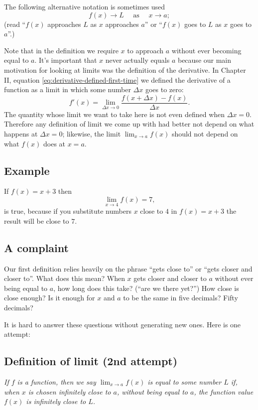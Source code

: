 The following alternative notation is sometimes used
\[
f(x)\to L \quad\text{ as } \quad x\to a;
\]
(read ``$f(x)$ approaches $L$ as $x$ approaches $a$'' or ``$f(x)$ goes to
$L$ as $x$ goes to $a$''.)

Note that in the definition we require $x$ to approach $a$ without
ever becoming equal to $a$.  It's important that $x$ never actually 
equals $a$ because our main motivation for looking at limits was
the definition of the derivative.  In Chapter II, equation 
\eqref{eq:derivative-defined-first-time} we defined the derivative of
a function as a limit in which some number $\Delta x$ goes to zero:
\[
f'(x) = \lim_{\Delta x\to0} \frac{f(x+\Delta x)-f(x)}{\Delta x}.
\]
The quantity whose limit we want to take here is not even defined when
$\Delta x=0$.  Therefore any definition of limit we come up with had
better not depend on what happens at $\Delta x=0$; likewise, the limit
$\lim_{x\to a}f(x)$ should not depend on what $f(x)$ does at $x=a$.


\subsection{Example}
If $f(x) = x+3$ then
\[
\lim_{x\to 4} f(x) = 7,
\]
is true, because if you substitute numbers $x$ close to $4$ in $f(x) = x+3$
the result will be close to $7$.

\subsection{A complaint}
Our first definition relies heavily on the
phrase ``gets close to'' or ``gets closer and closer to''.  What does
this mean?  When $x$ gets closer and closer to $a$ without ever being
equal to $a$, how long does this take? (``are we there yet?'') How
close is close enough?  Is it enough for $x$ and $a$ to be the same in
five decimals?  Fifty decimals?

It is hard to answer these questions without generating new ones.
Here is one attempt:

\subsection{Definition of limit (2nd attempt)}
\itshape%
If $f$ is a function, then we say $\lim_{x\to a}f(x)$ is equal to some
number $L$ if, when $x$ is chosen infinitely close to $a$, without
being equal to $a$, the function value $f(x)$ is infinitely close to
$L$.\upshape\smallskip

